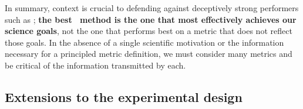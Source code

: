 In summary, context is crucial to defending against deceptively strong performers such as \trainz; \textbf{the best \pzpdf\ method is the one that most effectively achieves our science goals}, not the one that performs best on a metric that does not reflect those goals.
In the absence of a single scientific motivation or the information necessary for a principled metric definition, we must consider many metrics and be critical of the information transmitted by each.

\subsection{Extensions to the experimental design}
\label{sec:futureexperiments}

